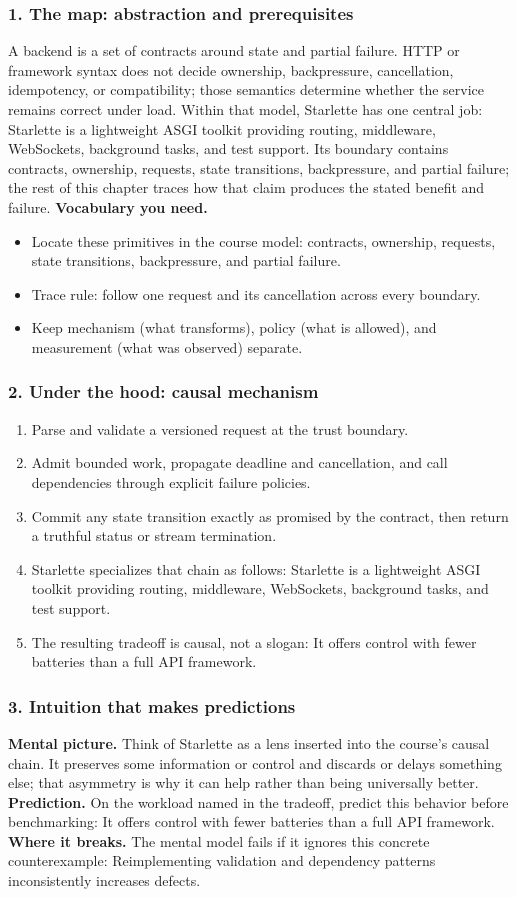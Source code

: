\subsubsection*{1. The map: abstraction and prerequisites}
A backend is a set of contracts around state and partial failure. HTTP or framework syntax does not decide ownership, backpressure, cancellation, idempotency, or compatibility; those semantics determine whether the service remains correct under load.
Within that model, Starlette has one central job: Starlette is a lightweight ASGI toolkit providing routing, middleware, WebSockets, background tasks, and test support. Its boundary contains contracts, ownership, requests, state transitions, backpressure, and partial failure; the rest of this chapter traces how that claim produces the stated benefit and failure.
\textbf{Vocabulary you need.}\begin{itemize}
\item Locate these primitives in the course model: contracts, ownership, requests, state transitions, backpressure, and partial failure.
\item Trace rule: follow one request and its cancellation across every boundary.
\item Keep mechanism (what transforms), policy (what is allowed), and measurement (what was observed) separate.
\end{itemize}
\subsubsection*{2. Under the hood: causal mechanism}\begin{enumerate}
\item Parse and validate a versioned request at the trust boundary.
\item Admit bounded work, propagate deadline and cancellation, and call dependencies through explicit failure policies.
\item Commit any state transition exactly as promised by the contract, then return a truthful status or stream termination.
\item Starlette specializes that chain as follows: Starlette is a lightweight ASGI toolkit providing routing, middleware, WebSockets, background tasks, and test support.
\item The resulting tradeoff is causal, not a slogan: It offers control with fewer batteries than a full API framework.
\end{enumerate}
\subsubsection*{3. Intuition that makes predictions}
\textbf{Mental picture.} Think of Starlette as a lens inserted into the course's causal chain. It preserves some information or control and discards or delays something else; that asymmetry is why it can help rather than being universally better.
\textbf{Prediction.} On the workload named in the tradeoff, predict this behavior before benchmarking: It offers control with fewer batteries than a full API framework.
\textbf{Where it breaks.} The mental model fails if it ignores this concrete counterexample: Reimplementing validation and dependency patterns inconsistently increases defects.
